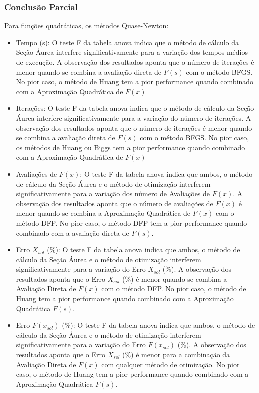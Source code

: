 \subsubsection{Conclusão Parcial}
        Para funções quadráticas, os métodos Quase-Newton:
        \begin{itemize}
        \item {Tempo (s):}  O teste F da tabela anova indica que o método de cálculo da Seção Áurea interfere significativamente para a variação dos tempos médios de execução. A observação dos resultados aponta que o número de iterações é menor quando se combina a avaliação direta de $F(s)$ com o método BFGS. No pior caso, o método de Huang tem a pior performance quando combinado com a Aproximação Quadrática de $F(x)$
        \item {Iterações:}   O teste F da tabela anova indica que o método de cálculo da Seção Áurea interfere significativamente para a variação do número de iterações. A observação dos resultados aponta que o número de iterações é menor quando se combina a avaliação direta de $F(s)$ com o método BFGS. No pior caso, os métodos de Huang ou Biggs tem a pior performance quando combinado com a Aproximação Quadrática de $F(x)$
        \item {Avaliações de $F(x)$:} O teste F da tabela anova indica que ambos, o método de cálculo da Seção Áurea e o método de otimização interferem significativamente para a variação dos número de Avaliações de $F(x)$. A observação dos resultados aponta que o número de avaliações de $F(x)$ é menor quando se combina a Aproximação Quadrática de $F(x)$ com o método DFP. No pior caso, o método DFP tem a pior performance quando combinado com a  avaliação direta de $F(s)$.
        \item {Erro $X_{sol}$ (\%):} O teste F da tabela anova indica que ambos, o método de cálculo da Seção Áurea e o método de otimização interferem significativamente para a variação do Erro $X_{sol}$ (\%). A observação dos resultados aponta que o Erro $X_{sol}$ (\%) é menor quando se combina a Avaliação Direta de $F(x)$ com o método DFP. No pior caso, o método de Huang tem a pior performance quando combinado com a Aproximação Quadrática $F(s)$.
        \item {Erro $F(x_{sol})$ (\%):}  O teste F da tabela anova indica que ambos, o método de cálculo da Seção Áurea e o método de otimização interferem significativamente para a variação do Erro $F(x_{sol})$ (\%). A observação dos resultados aponta que o Erro $X_{sol}$ (\%) é menor para a combinação da Avaliação Direta de $F(x)$ com qualquer método de otimização. No pior caso, o método de Huang tem a pior performance quando combinado com a Aproximação Quadrática $F(s)$.
        \end{itemize}
